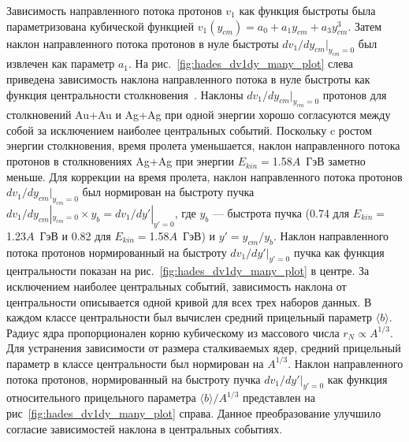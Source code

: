 Зависимость направленного потока протонов $v_1$ как функция быстроты была параметризована кубической функцией $v_1(y_{cm}) = a_0 + a_1 y_{cm} + a_3 y_{cm}^3$. 
Затем наклон направленного потока протонов в нуле быстроты $dv_1/dy_{cm}|_{y_{cm}=0}$ был извлечен как параметр $a_1$.
На рис.~\ref{fig:hades_dv1dy_many_plot} слева приведена зависимость наклона направленного потока в нуле быстроты как функция центральности столкновения~\cite{Mamaev:2024-2}.
Наклоны $dv_1/dy_{cm}|_{y_{cm}=0}$ протонов для столкновений Au+Au и Ag+Ag при одной энергии хорошо согласуются между собой за исключением наиболее центральных событий. 
Поскольку c ростом энергии столкновения, время пролета уменьшается, наклон направленного потока протонов в столкновениях Ag+Ag при энергии $E_{kin}=$1.58$A$~ГэВ заметно меньше.
Для коррекции на время пролета, наклон направленного потока протонов $dv_1/dy_{cm}|_{y_{cm}=0}$ был нормирован на быстроту пучка $dv_1/dy_{cm}|_{y_{cm}=0} \times y_{b} = dv_1/dy'|_{y'=0}$, где $y_{b}$ --- быстрота пучка (0.74 для $E_{kin}=$1.23$A$~ГэВ и 0.82 для  $E_{kin}=$1.58$A$~ГэВ) и $y'=y_{cm}/y_b$.
Наклон направленного потока протонов нормированный на быстроту $dv_1/dy'|_{y'=0}$ пучка как функция центральности показан на рис.~\ref{fig:hades_dv1dy_many_plot} в центре. 
За исключением наиболее центральных событий, зависимость наклона от центральности описывается одной кривой для всех трех наборов данных.
В каждом классе центральности был вычислен средний прицельный параметр $\langle b \rangle$. 
Радиус ядра пропорционален корню кубическому из массового числа $r_N \propto A^{1/3}$.
Для устранения зависимости от размера сталкиваемых ядер, средний прицельный параметр в классе центральности был нормирован на $A^{1/3}$.
Наклон направленного потока протонов, нормированный на быстроту пучка $dv_1/dy'|_{y'=0}$ как функция относительного прицельного параметра  $ \langle b \rangle / A^{1/3}$ представлен на рис~\ref{fig:hades_dv1dy_many_plot} справа.
Данное преобразование улучшило согласие зависимостей наклона в центральных событиях. 
%
